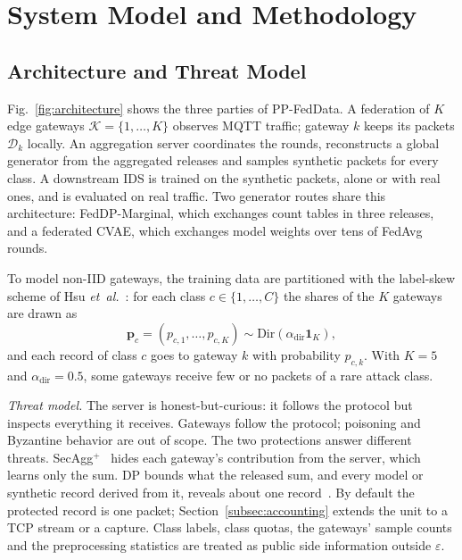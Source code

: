 \section{System Model and Methodology}\label{sec:methodology}

\subsection{Architecture and Threat Model}\label{subsec:system}
Fig.~\ref{fig:architecture} shows the three parties of PP-FedData. A federation of $K$ edge gateways $\mathcal{K} = \{1, \dots, K\}$ observes MQTT traffic; gateway $k$ keeps its packets $\mathcal{D}_k$ locally. An aggregation server coordinates the rounds, reconstructs a global generator from the aggregated releases and samples synthetic packets for every class. A downstream IDS is trained on the synthetic packets, alone or with real ones, and is evaluated on real traffic. Two generator routes share this architecture: FedDP-Marginal, which exchanges count tables in three releases, and a federated CVAE, which exchanges model weights over tens of FedAvg rounds.

To model non-IID gateways, the training data are partitioned with the label-skew scheme of Hsu \textit{et~al.}~\cite{hsu2019}: for each class $c \in \{1, \dots, C\}$ the shares of the $K$ gateways are drawn as
\begin{equation}
\mathbf{p}_c = (p_{c,1}, \dots, p_{c,K}) \sim \mathrm{Dir}(\alpha_{\mathrm{dir}} \mathbf{1}_K),
\label{eq:dirichlet}
\end{equation}
and each record of class $c$ goes to gateway $k$ with probability $p_{c,k}$. With $K = 5$ and $\alpha_{\mathrm{dir}} = 0.5$, some gateways receive few or no packets of a rare attack class.

\textit{Threat model.} The server is honest-but-curious: it follows the protocol but inspects everything it receives. Gateways follow the protocol; poisoning and Byzantine behavior are out of scope. The two protections answer different threats. SecAgg$^+$~\cite{bell2020} hides each gateway's contribution from the server, which learns only the sum. DP bounds what the released sum, and every model or synthetic record derived from it, reveals about one record~\cite{dwork2014}. By default the protected record is one packet; Section~\ref{subsec:accounting} extends the unit to a TCP stream or a capture. Class labels, class quotas, the gateways' sample counts and the preprocessing statistics are treated as public side information outside $\varepsilon$.

